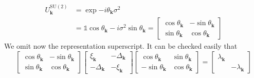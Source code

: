 \[
\begin{aligned}
	U_\mathbf{k}^{\mathrm{SU}(2)} &= \exp{- i \theta_\mathbf{k} \sigma^2} \\
	&= \mathbb{1} \cos \theta_\mathbf{k} - i \sigma^2 \sin \theta_\mathbf{k} = \begin{bmatrix}
		\cos \theta_\mathbf{k} & - \sin \theta_\mathbf{k} \\
		\sin \theta_\mathbf{k} & \cos \theta_\mathbf{k}
	\end{bmatrix}
\end{aligned}
\]
We omit now the representation superscript. It can be checked easily that
\[
	\begin{bmatrix}
		\cos \theta_\mathbf{k} & - \sin \theta_\mathbf{k} \\
		\sin \theta_\mathbf{k} & \cos \theta_\mathbf{k}
	\end{bmatrix} 
	\begin{bmatrix}
		\xi_\mathbf{k} & - \Delta_\mathbf{k} \\
		- \Delta_\mathbf{k} & - \xi_\mathbf{k}
	\end{bmatrix}
	\begin{bmatrix}
		\cos \theta_\mathbf{k} & \sin \theta_\mathbf{k} \\
		- \sin \theta_\mathbf{k} & \cos \theta_\mathbf{k}
	\end{bmatrix} =
	\begin{bmatrix}
		\lambda_\mathbf{k} & \\
		& -\lambda_\mathbf{k}
	\end{bmatrix}
\]


